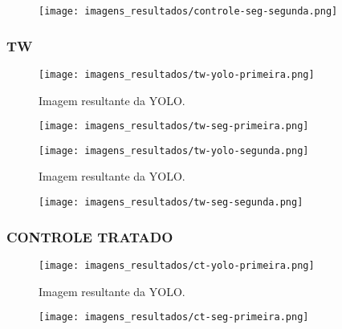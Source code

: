 \begin{figure}[!h]
    \centering
    \texttt{[image: imagens\_resultados/controle-seg-segunda.png]}
    \caption{}
    \label{fig:controle-seg-segunda}
\end{figure}

\subsubsection{TW}

\begin{figure}[!h]
    \centering
    \texttt{[image: imagens\_resultados/tw-yolo-primeira.png]}
    \caption{Imagem resultante da YOLO.}
    \label{fig:tw-yolo-primeira}
\end{figure}

\begin{figure}[!h]
    \centering
    \texttt{[image: imagens\_resultados/tw-seg-primeira.png]}
    \caption{}
    \label{fig:tw-seg-primeira}
\end{figure}

\begin{figure}[!h]
    \centering
    \texttt{[image: imagens\_resultados/tw-yolo-segunda.png]}
    \caption{Imagem resultante da YOLO.}
    \label{fig:tw-yolo-segunda}
\end{figure}

\begin{figure}[!h]
    \centering
    \texttt{[image: imagens\_resultados/tw-seg-segunda.png]}
    \caption{}
    \label{fig:tw-seg-segunda}
\end{figure}

\subsubsection{CONTROLE TRATADO}

\begin{figure}[!h]
    \centering
    \texttt{[image: imagens\_resultados/ct-yolo-primeira.png]}
    \caption{Imagem resultante da YOLO.}
    \label{fig:ct-yolo-primeira}
\end{figure}

\begin{figure}[!h]
    \centering
    \texttt{[image: imagens\_resultados/ct-seg-primeira.png]}
    \caption{}
    \label{fig:ct-seg-primeira}
\end{figure}

